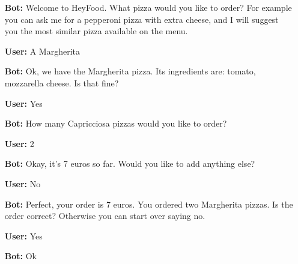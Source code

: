 \begin{itemize}

\item[\textbf{Bot:}] Welcome to HeyFood.
What pizza would you like to order? For example you can ask me for a pepperoni pizza with extra cheese, and I will suggest you the most similar pizza available on the menu.


\item[\textbf{User:}] A Margherita

\item[\textbf{Bot:}] Ok, we have the Margherita pizza. Its ingredients are: tomato, mozzarella cheese. Is that fine?

\item[\textbf{User:}]Yes

\item[\textbf{Bot:}] How many Capricciosa pizzas would you like to order?

\item[\textbf{User:}]2

\item[\textbf{Bot:}]Okay, it’s 7 euros so far. Would you like to add anything else?

\item[\textbf{User:}]No

\item[\textbf{Bot:}] Perfect, your order is 7 euros. You ordered  two Margherita pizzas. Is the order correct? Otherwise you can start over saying no.

\item[\textbf{User:}]Yes

\item[\textbf{Bot:}]Ok

\end{itemize}

